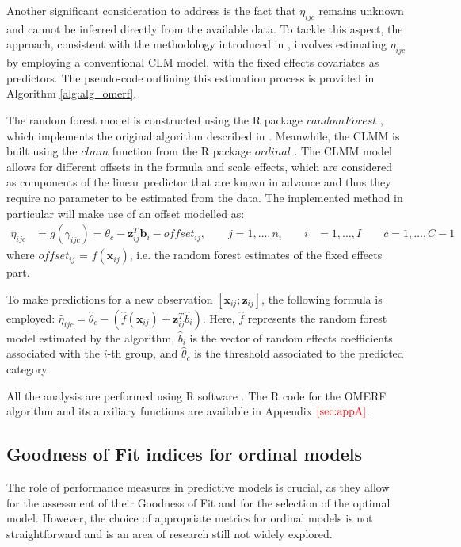 Another significant consideration to address is the fact that \(\eta_{ijc}\) remains unknown and cannot be inferred directly from the available data.
To tackle this aspect, the approach, consistent with the methodology introduced in \cite{fontana2021performing,pellagatti2021generalized}, involves estimating \(\eta_{ijc}\) by employing a conventional CLM model, with the fixed effects covariates as predictors.
The pseudo-code outlining this estimation process is provided in Algorithm \ref{alg:alg_omerf}.

The random forest model is constructed using the R package \(randomForest\) \cite{RF}, which implements the original algorithm described in \cite{breiman2001random}. Meanwhile, the CLMM is built using the \(clmm\) function from the R package \(ordinal\) \cite{ordinal}.
The CLMM model allows for different offsets in the formula and scale effects, which are considered as components of the linear predictor that are known in advance and thus  they require no parameter to be estimated from the data. The implemented method in particular will make use of an offset modelled as:
\begin{equation}
    \label{scale_eff}
    \begin{aligned}
        \eta_{ijc}  &= g(\gamma_{ijc}) = \theta_{c} - \bm{z}_{ij}^T \bm{b}_{i} - offset_{ij}, \qquad  j=1,\dots,n_{i} \qquad i&=1,\dots,I \qquad c=1,\dots,C-1
    \end{aligned}
\end{equation}
where \(offset_{ij}\) =  \(f(\bm{x}_{ij})\), i.e. the random forest estimates of the fixed effects part.

To make predictions for a new observation \([\bm{x}_{ij};\bm{z}_{ij}]\), the following formula is employed: \(\hat{\eta}_{ijc} = \hat{\theta}_{c} - (\hat{f}(\bm{x}_{ij}) + \bm{z}_{ij}^T \hat{b}_{i})\).
Here, \(\hat{f}\) represents the random forest model estimated by the algorithm, \(\hat{b}_i\) is the vector of random effects coefficients associated with the \(i\)-th group, and \(\hat{\theta}_{c}\) is the threshold associated to the predicted category.


All the analysis are performed using R software \cite{rlanguage}. The R code for the OMERF algorithm and its auxiliary functions are available in Appendix \(\textcolor{red}{\ref{sec:appA}}\).

\subsection{Goodness of Fit indices for ordinal models}
\label{sec:gof}
The role of performance measures in predictive models is crucial, as they allow for the assessment of their Goodness of Fit and for the selection of the optimal model.
However, the choice of appropriate metrics for ordinal models is not straightforward and is an area of research still not widely explored.

